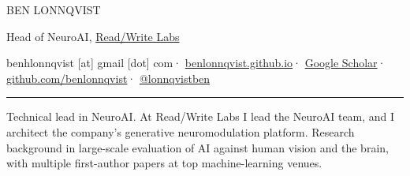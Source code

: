 \documentclass[10pt]{article}
\begin{document}
\raggedright\sloppy

{\cond\fontsize{30}{30}\selectfont BEN LONNQVIST}\par\vspace{5pt}
{\large Head of NeuroAI, \href{https://readwritelabs.com}{Read/Write Labs}}\par\vspace{6pt}
{\ttfamily\scriptsize\color{muted}
benhlonnqvist [at] gmail [dot] com\enspace·\enspace
\href{https://benlonnqvist.github.io}{benlonnqvist.github.io}\enspace·\enspace
\href{https://scholar.google.com/citations?user=be0tNVwAAAAJ}{Google Scholar}\enspace·\enspace
\href{https://github.com/benlonnqvist}{github.com/benlonnqvist}\enspace·\enspace
\href{https://x.com/lonnqvistben}{@lonnqvistben}}
\par\vspace{8pt}
{\color{ink}\rule{\linewidth}{1.2pt}}\par\vspace{7pt}
{\small Technical lead in NeuroAI. At Read/Write Labs I lead the NeuroAI team, and I architect the company's generative neuromodulation platform.
Research background in large-scale evaluation of AI against human vision and the brain, with multiple first-author papers
at top machine-learning venues.}
\end{document}
